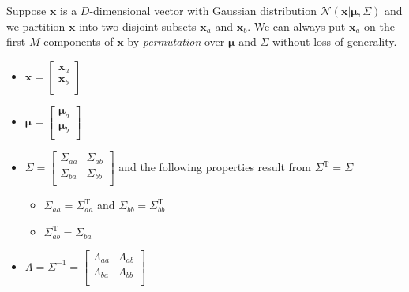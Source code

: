 Suppose $\mathbf{x}$ is a $D$-dimensional vector with Gaussian
distribution $\mathcal{N}(\mathbf{x}\vert{}\boldsymbol{\mu},\Sigma)$
and we partition $\mathbf{x}$ into two disjoint subsets $\mathbf{x}_{a}$
and $\mathbf{x}_{b}$. We can always put $\mathbf{x}_{a}$ on the first
$M$ components of $\mathbf{x}$ by \emph{permutation} over $\boldsymbol{\mu}$
and $\Sigma$ without loss of generality.
\begin{itemize}
\item $\mathbf{x}=\begin{bmatrix}\mathbf{x}_{a}\\\mathbf{x}_{b}\\\end{bmatrix}$
\item
$\boldsymbol{\mu}=\begin{bmatrix}\boldsymbol{\mu}_{a}\\\boldsymbol{\mu}_{b}\\\end{bmatrix}$
\item
$\Sigma=\begin{bmatrix}\Sigma_{aa}&\Sigma_{ab}\\\Sigma_{ba}&\Sigma_{bb}\\\end{bmatrix}$
and the following properties result from $\Sigma^{\mathrm{T}}=\Sigma$
    \begin{itemize}
    \item $\Sigma_{aa}=\Sigma_{aa}^{\mathrm{T}}$ and $\Sigma_{bb}=\Sigma_{bb}^{\mathrm{T}}$
    \item $\Sigma_{ab}^{\mathrm{T}}=\Sigma_{ba}$
    \end{itemize}
\item $\Lambda=\Sigma^{-1}=\begin{bmatrix}\Lambda_{aa}&\Lambda_{ab}\\\Lambda_{ba}&\Lambda_{bb}\\\end{bmatrix}$
\end{itemize}


